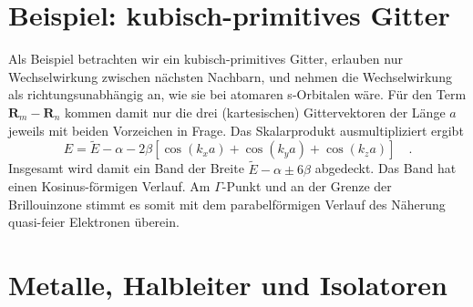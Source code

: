 \section{Beispiel: kubisch-primitives Gitter}

Als Beispiel betrachten wir ein kubisch-primitives Gitter, erlauben nur Wechselwirkung zwischen nächsten Nachbarn, und nehmen die Wechselwirkung als richtungsunabhängig an, wie sie bei atomaren s-Orbitalen wäre. Für den Term $\mathbf{R}_m  - \mathbf{R}_n$ kommen damit nur die drei (kartesischen) Gittervektoren der Länge $a$ jeweils mit beiden Vorzeichen in Frage. Das Skalarprodukt ausmultipliziert ergibt
\begin{equation}
    E = \tilde{E} - \alpha - 2 \beta \left[ \cos( k_x a ) +  \cos( k_y a ) +  \cos( k_z a ) \right] \quad .
\end{equation}
Insgesamt wird damit ein Band der Breite $\tilde{E} - \alpha \pm  6 \beta $ abgedeckt. Das Band hat einen Kosinus-förmigen Verlauf. Am $\Gamma$-Punkt und an der Grenze der Brillouinzone stimmt es somit mit dem parabelförmigen Verlauf des Näherung quasi-feier Elektronen überein. 








\section{Metalle, Halbleiter und Isolatoren}

